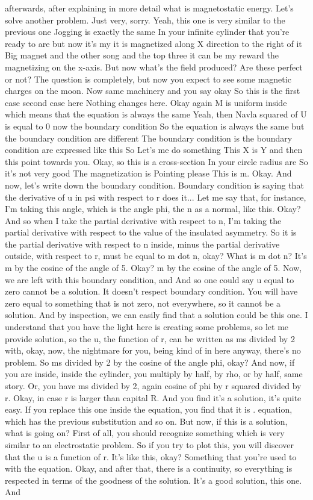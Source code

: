 afterwards, after explaining in more detail what is magnetostatic energy.
Let's solve another problem. Just very, sorry. Yeah, this one is very similar to the previous one Jogging is exactly the same In your infinite cylinder that you're ready to are but now it's my it is magnetized along X direction to the right of it Big magnet and the other song and the top three it can be my reward the magnetizing on the x-axis. But now what's the field produced? Are these perfect or not? The question is completely, but now you expect to see some magnetic charges on the moon. Now same machinery and you say okay So this is the first case second case here Nothing changes here. Okay again M is uniform inside which means that the equation is always the same Yeah, then Navla squared of U is equal to 0 now the boundary condition So the equation is always the same but the boundary condition are different The boundary condition is the boundary condition are expressed like this So Let's me do something This X is Y and then this point towards you. Okay, so this is a cross-section In your circle radius are So it's not very good The magnetization is Pointing please This is m. Okay. And now, let's write down the boundary condition. Boundary condition is saying that the derivative of u in psi with respect to r does it... Let me say that, for instance, I'm taking this angle, which is the angle phi, the n as a normal, like this. Okay? And so when I take the partial derivative with respect to n, I'm taking the partial derivative with respect to the value of the insulated asymmetry. So it is the partial derivative with respect to n inside, minus the partial derivative outside, with respect to r, must be equal to m dot n, okay? What is m dot n? It's m by the cosine of the angle of 5. Okay? m by the cosine of the angle of 5. Now, we are left with this boundary condition, and And so one could say u equal to zero cannot be a solution. It doesn't respect boundary condition. You will have zero equal to something that is not zero, not everywhere, so it cannot be a solution. And by inspection, we can easily find that a solution could be this one. I understand that you have the light here is creating some problems, so let me provide solution, so the u, the function of r, can be written as ms divided by 2 with, okay, now, the nightmare for you, being kind of in here anyway, there's no problem. So ms divided by 2 by the cosine of the angle phi, okay? And now, if you are inside, inside the cylinder, you multiply by half, by rho, or by half, same story. Or, you have ms divided by 2, again cosine of phi by r squared divided by r. Okay, in case r is larger than capital R. And you find it's a solution, it's quite easy. If you replace this one inside the equation, you find that it is . equation, which has the previous substitution and so on. But now, if this is a solution, what is going on? First of all, you should recognize something which is very similar to an electrostatic problem. So if you try to plot this, you will discover that the u is a function of r. It's like this, okay? Something that you're used to with the equation. Okay, and after that, there is a continuity, so everything is respected in terms of the goodness of the solution. It's a good solution, this one. And 